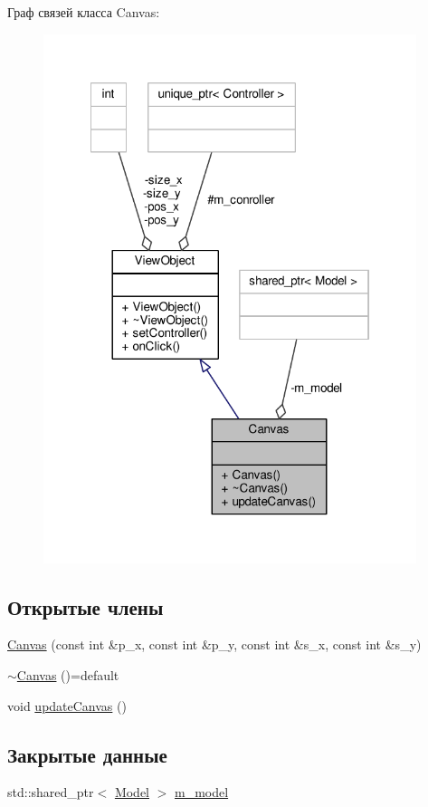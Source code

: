 Граф связей класса Canvas\-:
\nopagebreak
\begin{figure}[H]
\begin{center}
\leavevmode
\includegraphics[width=309pt]{class_canvas__coll__graph}
\end{center}
\end{figure}
\subsection*{Открытые члены}
\begin{DoxyCompactItemize}
\item 
\hyperlink{class_canvas_a90a539fde4aa87ad1d09ca220df17c99}{Canvas} (const int \&p\-\_\-x, const int \&p\-\_\-y, const int \&s\-\_\-x, const int \&s\-\_\-y)
\item 
\hyperlink{class_canvas_ac64895ae1cdfc39c58e95097873e861e}{$\sim$\-Canvas} ()=default
\item 
void \hyperlink{class_canvas_a8514b56f7bee6b267dd12b9b11aa97d6}{update\-Canvas} ()
\end{DoxyCompactItemize}
\subsection*{Закрытые данные}
\begin{DoxyCompactItemize}
\item 
std\-::shared\-\_\-ptr$<$ \hyperlink{class_model}{Model} $>$ \hyperlink{class_canvas_a4bae0f13adb834323d28fd1a5884b6e0}{m\-\_\-model}
\end{DoxyCompactItemize}
